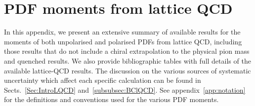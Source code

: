 \section{PDF moments from lattice QCD}
\label{sec:LQCDtables}

In this appendix, we present an extensive summary of available results for the 
moments of both unpolarised and polarised PDFs from lattice QCD, including 
those results that do not include a chiral extrapolation to the physical 
pion mass and quenched results. 
%
We also provide bibliographic tables with full
details of the available lattice-QCD results.
%
The discussion on the various sources of systematic uncertainty which
affect each specific calculation can be found in Sects.~\ref{Sec:IntroLQCD}
and~\ref{subsubsec:BClQCD}.
%
See appendix~\ref{app:notation} for the definitions and conventions used
for the various PDF moments.


